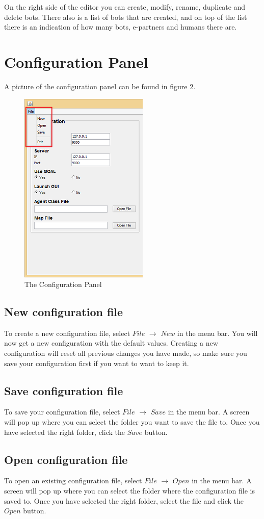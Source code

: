 \documentclass[a4paper]{article}
\begin{document}
On the right side of the editor you can create, modify, rename, duplicate and delete bots. There also is a list of bots that are created, and on top of the list there is an indication of how many bots, e-partners and humans there are.
\pagebreak
\section{Configuration Panel}
A picture of the configuration panel can be found in figure 2.
\begin{figure}
\includegraphics{config.png}
\caption{The Configuration Panel}
\end{figure}
\subsection{New configuration file}
To create a new configuration file, select $File$ $\to$ $New$ in the menu bar. You will now get a new configuration with the default values. Creating a new configuration will reset all previous changes you have made, so make sure you save your configuration first if you want to want to keep it.

\subsection{Save configuration file}
To save your configuration file, select $File$ $\to$ $Save$ in the menu bar. A screen will pop up where you can select the folder you want to save the file to. Once you have selected the right folder, click the $Save$ button.

\subsection{Open configuration file}
To open an existing configuration file, select $File$ $\to$ $Open$ in the menu bar. A screen will pop up where you can select the folder where the configuration file is saved to. Once you have selected the right folder, select the file and click the $Open$ button.
\pagebreak
\end{document}
